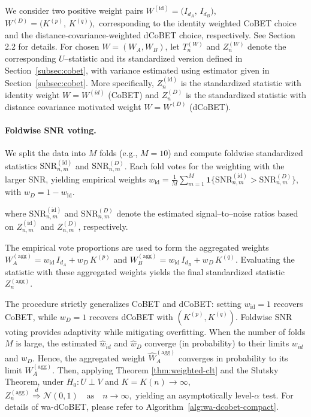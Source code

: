 \documentclass[12pt,reqno,oneside]{amsbook}
\theoremstyle{definition}
\theoremstyle{remark}
\DeclareMathOperator{\Var}{Var}
\begin{document}
We consider two positive weight pairs
$W^{(\mathrm{id})} = \bigl(I_{d_A},\, I_{d_B}\bigr)$, 
$W^{(D)} = \bigl(K^{(p)},\, K^{(q)}\bigr),$
corresponding to the identity weighted CoBET choice and the distance-covariance-weighted dCoBET choice, respectively. See Section 2.2 for
details. For chosen $W=(W_A,W_B)$, let $T_n^{(W)}$ and $Z_n^{(W)}$ denote the corresponding $U$--statistic and its standardized version  defined in Section~\ref{subsec:cobet}, with variance estimated using estimator given in Section~\ref{subsec:cobet}. More specifically, $Z_n^{(\mathrm{id})}$ is
the standardized statistic with identity weight $W=W^{(id)}$ (CoBET)
and $Z_n^{(D)}$ is
the standardized statistic with distance covariance motivated weight $W=W^{(D)}$ (dCoBET).

\paragraph{Foldwise SNR voting.}
We split the data into $M$ folds (e.g., $M=10$) and compute foldwise standardized
statistics $\mathrm{SNR}_{n,m}^{(\mathrm{id})}$ and $\mathrm{SNR}_{n,m}^{(D)}$.
Each fold votes for the weighting with the larger SNR, yielding empirical
weights
$w_{\mathrm{id}}=\frac1M\sum_{m=1}^M
\mathbf 1\{\mathrm{SNR}_{n,m}^{(\mathrm{id})}>\mathrm{SNR}_{n,m}^{(D)}\}$,
with $w_D=1-w_{\mathrm{id}}$.

where $\mathrm{SNR}_{n,m}^{(\mathrm{id})}$ and $\mathrm{SNR}_{n,m}^{(D)}$ denote
the estimated signal--to--noise ratios based on
$Z_{n,m}^{(\mathrm{id})}$ and $Z_{n,m}^{(D)}$, respectively.

The empirical vote proportions are used to form the aggregated weights
$
W_A^{(\mathrm{agg})}
= w_{\mathrm{id}}\,I_{d_A} + w_D\,K^{(p)}$ and 
$W_B^{(\mathrm{agg})}
= w_{\mathrm{id}}\,I_{d_B} + w_D\,K^{(q)}.
$
Evaluating the statistic with these aggregated weights yields the final
standardized statistic $Z_n^{(\mathrm{agg})}$.

The procedure strictly generalizes CoBET and dCoBET: setting
$w_{\mathrm{id}}=1$ recovers CoBET, while $w_D=1$ recovers dCoBET with
$(K^{(p)},K^{(q)})$. 
Foldwise
SNR voting provides adaptivity while mitigating overfitting. When the number of folds $M$ is large, the estimated $\hat{w}_{id}$ and $\hat{w}_{D}$ converge (in probability) to their limits ${w}_{id}$ and ${w}_{D}$. Hence, the aggregated weight $\hat{W}_A^{(\mathrm{agg})}$ converges in probability to its limit $W_A^{(\mathrm{agg})}$. Then, applying Theorem \ref{thm:weighted-clt} and the Slutsky Theorem, under
$H_0: U \perp V$ and $K=K(n)\to\infty$,
$
Z_n^{(\mathrm{agg})} \stackrel{d}{\Rightarrow} \mathcal N(0,1)
\quad \text{as}\quad n\to\infty,
$
yielding an asymptotically level-$\alpha$ test.
For details of wa-dCoBET, please refer to Algorithm~\ref{alg:wa-dcobet-compact}. 
\end{document}
